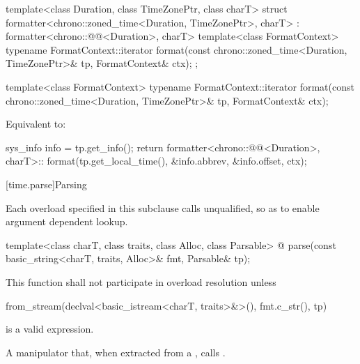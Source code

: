 %
\begin{codeblock}
template<class Duration, class TimeZonePtr, class charT>
struct formatter<chrono::zoned_time<Duration, TimeZonePtr>, charT>
    : formatter<chrono::@@<Duration>, charT> {
  template<class FormatContext>
    typename FormatContext::iterator
      format(const chrono::zoned_time<Duration, TimeZonePtr>& tp, FormatContext& ctx);
};
\end{codeblock}

%
\begin{itemdecl}
template<class FormatContext>
  typename FormatContext::iterator
    format(const chrono::zoned_time<Duration, TimeZonePtr>& tp, FormatContext& ctx);
\end{itemdecl}

\begin{itemdescr}
\pnum
\effects
Equivalent to:
\begin{codeblock}
sys_info info = tp.get_info();
return formatter<chrono::@@<Duration>, charT>::
         format({tp.get_local_time(), &info.abbrev, &info.offset}, ctx);
\end{codeblock}
\end{itemdescr}

%

[time.parse]{Parsing}

%

\pnum
Each  overload specified in this subclause
calls  unqualified,
so as to enable argument dependent lookup.

\begin{itemdecl}
template<class charT, class traits, class Alloc, class Parsable>
  @\unspec@
    parse(const basic_string<charT, traits, Alloc>& fmt, Parsable& tp);
\end{itemdecl}

\begin{itemdescr}
\pnum
\remarks
This function shall not participate in overload resolution unless
\begin{codeblock}
from_stream(declval<basic_istream<charT, traits>&>(), fmt.c_str(), tp)
\end{codeblock}
is a valid expression.

\pnum
\returns
A manipulator that, when extracted from a
 ,
calls .
\end{itemdescr}

